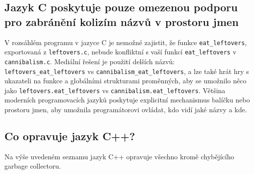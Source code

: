 \documentclass{article}
\begin{document}
	\subsection*{Jazyk C poskytuje pouze omezenou podporu pro zabránění kolizím názvů v prostoru jmen}
	
	V rozsáhlém programu v jazyce C je nemožné zajistit, že funkce \texttt{eat\_leftovers}, exportovaná z \texttt{leftovers.c}, nebude konfliktní s vaší funkcí \texttt{eat\_leftovers} v \texttt{cannibalism.c}. Mediální řešení je použití delších názvů: \texttt{leftovers\_eat\_leftovers} vs \texttt{cannibalism\_eat\_leftovers}, a lze také hrát hry s ukazateli na funkce a globálními strukturami proměnných, aby se umožnilo něco jako \texttt{leftovers.eat\_leftovers} vs \texttt{cannibalism.eat\_leftovers}. Většina moderních programovacích jazyků poskytuje explicitní mechanismus balíčku nebo prostoru jmen, aby umožnila programátorovi ovládat, kdo vidí jaké názvy a kde.
	
	\subsection*{Co opravuje jazyk C++?}
	
	Na výše uvedeném seznamu jazyk C++ opravuje všechno kromě chybějícího garbage collectoru.
	
\end{document}
